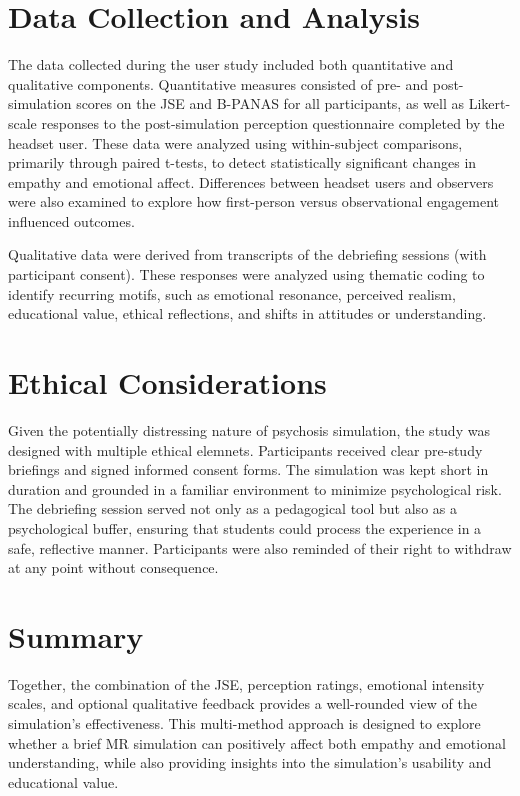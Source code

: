 \section{Data Collection and Analysis}

The data collected during the user study included both quantitative and qualitative components. Quantitative measures consisted of pre- and post-simulation scores on the JSE and B-PANAS for all participants, as well as Likert-scale responses to the post-simulation perception questionnaire completed by the headset user. These data were analyzed using within-subject comparisons, primarily through paired t-tests, to detect statistically significant changes in empathy and emotional affect. Differences between headset users and observers were also examined to explore how first-person versus observational engagement influenced outcomes.

Qualitative data were derived from transcripts of the debriefing sessions (with participant consent). These responses were analyzed using thematic coding to identify recurring motifs, such as emotional resonance, perceived realism, educational value, ethical reflections, and shifts in attitudes or understanding.

\section{Ethical Considerations}

Given the potentially distressing nature of psychosis simulation, the study was designed with multiple ethical elemnets. Participants received clear pre-study briefings and signed informed consent forms. The simulation was kept short in duration and grounded in a familiar environment to minimize psychological risk. The debriefing session served not only as a pedagogical tool but also as a psychological buffer, ensuring that students could process the experience in a safe, reflective manner. Participants were also reminded of their right to withdraw at any point without consequence.

\section{Summary}

Together, the combination of the JSE, perception ratings, emotional intensity scales, and optional qualitative feedback provides a well-rounded view of the simulation’s effectiveness. This multi-method approach is designed to explore whether a brief MR simulation can positively affect both empathy and emotional understanding, while also providing insights into the simulation’s usability and educational value.

